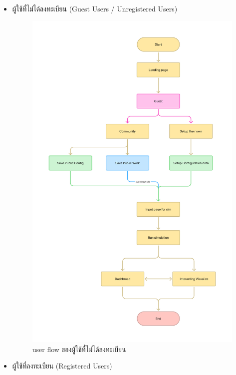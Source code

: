 \begin{mypara}

\begin{itemize}
    \item ผู้ใช้ที่ไม่ได้ลงทะเบียน (Guest Users / Unregistered Users)
    \begin{figure}[H]
    \centering
    \includegraphics[width=\textwidth,height=0.6\textheight,keepaspectratio]{User_flow_-_guest.png}
    \caption{user flow  ของผู้ใช้ที่ไม่ได้ลงทะเบียน}
    \label{fig:UserFlowUnregistered}
    \end{figure}
    \newpage
    \item ผู้ใช้ที่ลงทะเบียน (Registered Users)
    \begin{figure}[H]

\end{figure}
\end{itemize}
\end{mypara}
